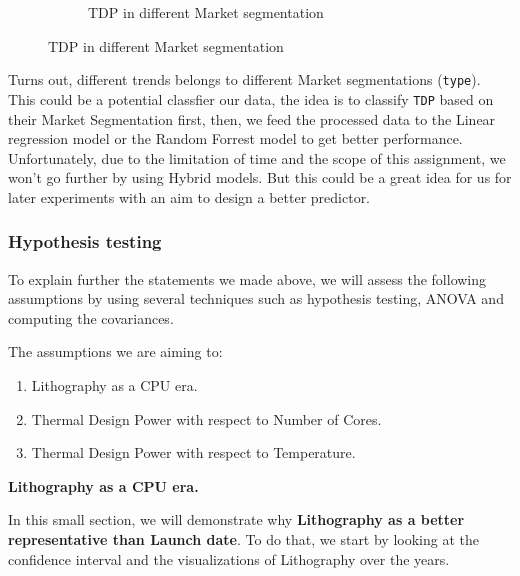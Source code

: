 \begin{itemize}
\begin{figure}[H]
\begin{subfigure}[]{0.4\textwidth}
                \caption{TDP in different Market segmentation}
            \end{subfigure}
        \end{figure}

    Turns out, different trends belongs to different Market segmentations (\verb|type|). This could be a potential classfier our data, the idea is to classify \verb|TDP| based on their Market Segmentation first,
    then, we feed the processed data to the Linear regression model or the Random Forrest model to get better performance. Unfortunately, due to the limitation of time and the scope of this assignment, we won't
    go further by using Hybrid models. But this could be a great idea for us for later experiments with an aim to design a better predictor.
\end{itemize}


\subsubsection{Hypothesis testing}
\label{section:data_analysis_anova}

To explain further the statements we made above, we will assess the following assumptions by using several techniques such as 
hypothesis testing, ANOVA and computing the covariances.

The assumptions we are aiming to:
\begin{enumerate}
    \item Lithography as a CPU era.
    \item Thermal Design Power with respect to Number of Cores.
    \item Thermal Design Power with respect to Temperature.
\end{enumerate}











\textbf{Lithography as a CPU era.}

In this small section, we will demonstrate why \textbf{Lithography as a better representative than Launch date}. To do that, we start by looking at the confidence interval and the visualizations of Lithography over the years.

